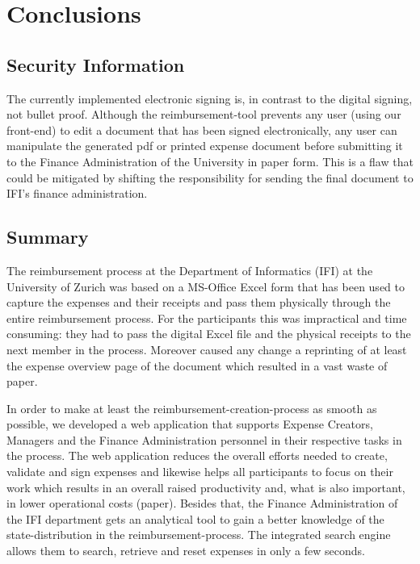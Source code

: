 \chapter{Conclusions}
 
\section{Security Information}
The currently implemented electronic signing is, in contrast to the digital signing, not bullet proof. Although the reimbursement-tool prevents any user (using our front-end) to edit a document that has been signed electronically, any user can manipulate the generated pdf or printed expense document before submitting it to the Finance Administration of the University in paper form. This is a flaw that could be mitigated by shifting the responsibility for sending the final document to IFI's finance administration.
 
 
\section{Summary}
The reimbursement process at the Department of Informatics (IFI) at the University of Zurich was based on a MS-Office Excel form that has been used to capture the expenses and their receipts and pass them physically through the entire reimbursement process. For the participants this was impractical and time consuming: they had to pass the digital Excel file and the physical receipts to the next member in the process. Moreover caused any change a reprinting of at least the expense overview page of the document which resulted in a vast waste of paper.\par

In order to make at least the reimbursement-creation-process as smooth as possible, we developed a web application that supports Expense Creators, Managers and the Finance Administration personnel in their respective tasks in the process. The web application reduces the overall efforts needed to create, validate and sign expenses and likewise helps all participants to focus on their work which results in an overall raised productivity and, what is also important, in lower operational costs (paper). Besides that, the Finance Administration of the IFI department gets an analytical tool to gain a better knowledge of the state-distribution in the reimbursement-process. The integrated search engine allows them to search, retrieve and reset expenses in only a few seconds. \par

